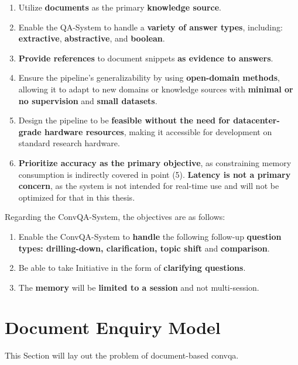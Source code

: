 \begin{enumerate}
    \item Utilize \textbf{documents} as the primary \textbf{knowledge source}.
    \item Enable the QA-System to handle a \textbf{variety of answer types}, including: \textbf{extractive}, \textbf{abstractive}, and \textbf{boolean}.
    \item \textbf{Provide references} to document snippets \textbf{as evidence to answers}.
    \item Ensure the pipeline's generalizability by using \textbf{open-domain methods}, allowing it to adapt to new domains or knowledge sources with \textbf{minimal or no supervision} and \textbf{small datasets}.
    \item Design the pipeline to be \textbf{feasible without the need for datacenter-grade hardware resources}, making it accessible for development on standard research hardware.
    \item \textbf{Prioritize accuracy as the primary objective}, as constraining memory consumption is indirectly covered in point (5). \textbf{Latency is not a primary concern}, as the system is not intended for real-time use and will not be optimized for that in this thesis.
\end{enumerate}


Regarding the ConvQA-System, the objectives are as follows:

\begin{enumerate}
    \item Enable the ConvQA-System to \textbf{handle} the following follow-up \textbf{question types: drilling-down, clarification, topic shift} and \textbf{comparison}.
    \item Be able to take Initiative in the form of \textbf{clarifying questions}.
    \item The \textbf{memory} will be \textbf{limited to a session} and not multi-session.
\end{enumerate}

\section{Document Enquiry Model}
\label{sec:problem_statement}

This Section will lay out the problem of document-based \gls{convqa}. 

